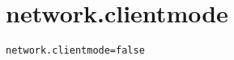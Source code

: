\section{network.clientmode}
\label{configuration:NetworkClientmode}
\ClearAPI
\TODO
{}
\begin{lstlisting}[style=Props,caption={Usage example for \textit{network.clientmode}}]
network.clientmode=false
\end{lstlisting}